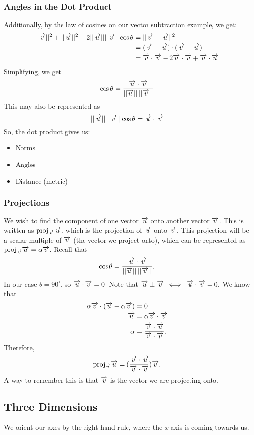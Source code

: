 \documentclass[12pt]{article}
\theoremstyle{plain} %
\theoremstyle{definition}
\theoremstyle{definition}
\theoremstyle{remark}
\newcommand{\vecv}{\vv{v}}
\newcommand{\vecu}{\vv{u}}
\newcommand*{\vv}[1]{\overrightarrow{\mkern0mu#1}}
\begin{document}
\subsubsection{Angles in the Dot Product}
Additionally, by the law of cosines on our vector subtraction example, we get:
\begin{align*}
||\vv{v}||^2 + ||\vv{u}||^2 - 2||\vv{u}|| ||\vv{v}|| \cos{\theta} & = ||\vv{v}-\vv{u}||^2 \\
& = (\vv{v}-\vv{u})\cdot(\vv{v}-\vv{u}) \\
& = \vv{v} \cdot \vv{v} - 2 \vv{u} \cdot \vv{v} + \vv{u} \cdot \vv{u}
\end{align*}
Simplifying, we get
    \[\cos{\theta} = \frac{\vv{u} \cdot \vv{v}}{||\vv{u}|| \, ||\vv{v}||}\]
This may also be represented as
\[ ||\vv{u}|| \, ||\vv{v}|| \cos{\theta} = \vv{u} \cdot \vv{v} \]
So, the dot product gives us:
\begin{itemize}
    \item Norms
    \item Angles
    \item Distance (metric)
\end{itemize}

\subsubsection{Projections}
We wish to find the component of one vector $\vv{u}$ onto another vector $\vv{v}$.
This is written as $\text{proj}_{\vv{v}}\vv{u}$, which is the projection of $\vecu$ onto $\vecv$.
This projection will be a scalar multiple of $\vecv$ (the vector we project onto),
which can be represented as $\text{proj}_{\vv{v}}\vv{u} = \alpha \vecv$.
Recall that
\[\cos{\theta} = \frac{\vv{u} \cdot \vv{v}}{||\vv{u}|| \, ||\vv{v}||}.\]
In our case $\theta=90^\circ$, so $\vecu \cdot \vecv = 0$.
Note that $\vecu \perp \vecv \: \iff \: \vecu \cdot \vecv = 0.$
We know that
\begin{align*}
    \alpha \vecv \cdot (\vecu - \alpha \vecv) & = 0 \\
    \vecu & = \alpha \vecv \cdot \vecv \\
    \alpha &= \frac{\vecv \cdot \vecu}{\vecv \cdot \vecv}.
\end{align*}
Therefore,
\[ \text{proj}_{\vecv} \vecu = (\frac{\vecv \cdot \vecu}{\vecv \cdot \vecv})\vecv .\]
A way to remember this is that $\vecv$ is the vector we are projecting onto.

\subsection{Three Dimensions}
We orient our axes by the right hand rule, where the $x$ axis is coming towards us.
\end{document}
